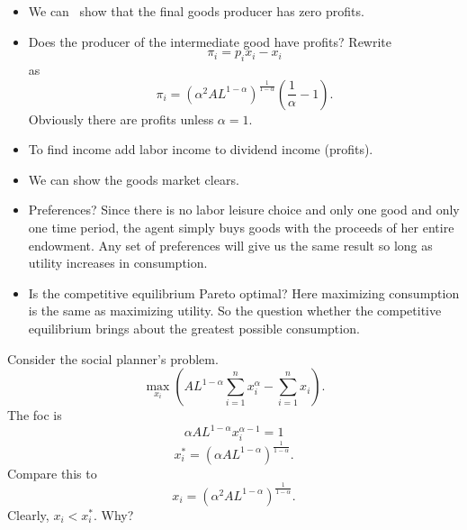 \documentclass{sebase}
\begin{document}
\begin{itemize}
\item We can \ show that the final goods producer has zero profits.

\item Does the producer of the intermediate good have profits? Rewrite%
\begin{equation*}
\pi _{i}=p_{i}x_{i}-x_{i}
\end{equation*}%
as%
\begin{equation*}
\pi _{i}=\left( \alpha ^{2}AL^{1-\alpha }\right) ^{\frac{1}{1-\alpha }%
}\left( \frac{1}{\alpha }-1\right) .
\end{equation*}%
Obviously there are profits unless $\alpha =1.$

\item To find income add labor income to dividend income (profits).

\item We can show the goods market clears.

\item Preferences? Since there is no labor leisure choice and only one good
and only one time period, the agent simply buys goods with the proceeds of
her entire endowment. Any set of preferences will give us the same result so
long as utility increases in consumption.

\item Is the competitive equilibrium Pareto optimal? Here maximizing
consumption is the same as maximizing utility. So the question whether the
competitive equilibrium brings about the greatest possible consumption.
\end{itemize}

\pagebreak

Consider the social planner's problem. 
\begin{equation*}
\underset{x_{i}}{\max }\left( AL^{1-\alpha }\overset{n}{\underset{i=1}{\sum }%
}x_{i}^{\alpha }-\overset{n}{\underset{i=1}{\sum }}x_{i}\right) .
\end{equation*}%
The foc is 
\begin{equation*}
\alpha AL^{1-\alpha }x_{i}^{\alpha -1}=1
\end{equation*}%
\begin{equation*}
x_{i}^{\ast }=\left( \alpha AL^{1-\alpha }\right) ^{\frac{1}{1-\alpha }}.
\end{equation*}%
Compare this to 
\begin{equation*}
x_{i}=\left( \alpha ^{2}AL^{1-\alpha }\right) ^{\frac{1}{1-\alpha }}.
\end{equation*}%
Clearly, $x_{i}<x_{i}^{\ast }$. Why?\pagebreak
\end{document}
